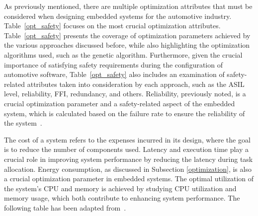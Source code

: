 \hspace{1cm}

As previously mentioned, there are multiple optimization attributes that must be considered when designing embedded systems for the automotive industry. Table~\ref{opt_safety} focuses on the most crucial optimization attributes.
Table~\ref{opt_safety} presents the coverage of optimization parameters achieved by the various approaches discussed before, while also highlighting the optimization algorithms used, such as the genetic algorithm.
Furthermore, given the crucial importance of satisfying safety requirements during the configuration of automotive software, Table~\ref{opt_safety} also includes an examination of safety-related attributes taken into consideration by each approach, such as the ASIL level, reliability, FFI, redundancy, and others. Reliability, previously noted, is a crucial optimization parameter and a safety-related aspect of the embedded system, which is calculated based on the failure rate to ensure the reliability of the system~\cite{xie2018reliability}.


The cost of a system refers to the expenses incurred in its design, where the goal is to reduce the number of components used. Latency and execution time play a crucial role in improving system performance by reducing the latency during task allocation. Energy consumption, as discussed in Subsection \ref{optimization}, is also a crucial optimization parameter in embedded systems. The optimal utilization of the system's CPU and memory is achieved by studying CPU utilization and memory usage, which both contribute to enhancing system performance. The following table has been adapted from~\cite{askaripoor2022architecture}.\newline







